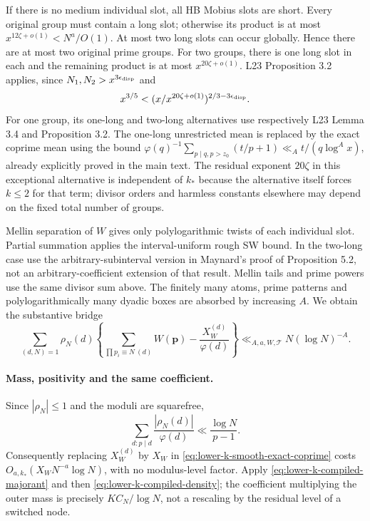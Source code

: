 If there is no medium individual slot, all HB Mobius slots are short.
Every original group must contain a long slot; otherwise its product
is at most $x^{12\zeta+o(1)}<N^a/O(1)$. At most two long slots can
occur globally. Hence there are at most two original prime groups.
For two groups, there is one long slot in each and the remaining
product is at most $x^{20\zeta+o(1)}$. L23 Proposition 3.2 applies,
since $N_1,N_2>x^{3\epsilon_{\rm disp}}$ and
\[
 x^{3/5}<(x/x^{20\zeta+o(1)})^{2/3-3\epsilon_{\rm disp}}.
\]
For one group, its one-long and two-long alternatives use respectively
L23 Lemma 3.4 and Proposition 3.2. The one-long unrestricted mean is
replaced by the exact coprime mean using the bound
$\varphi(q)^{-1}\sum_{p\mid q,p>z_0}(t/p+1)
\ll_A t/(q\log^A x)$, already explicitly proved in the main text.
The residual exponent $20\zeta$ in this exceptional alternative is
independent of $k_*$ because the alternative itself forces $k\le2$
for that term; divisor orders and harmless constants elsewhere may
depend on the fixed total number of groups.

Mellin separation of $W$ gives only polylogarithmic twists of each
individual slot. Partial summation applies the interval-uniform rough
SW bound. In the two-long case use the arbitrary-subinterval version
in Maynard's proof of Proposition 5.2, not an arbitrary-coefficient
extension of that result. Mellin tails and prime powers use the same
divisor sum above. The finitely many atoms, prime patterns and
polylogarithmically many dyadic boxes are absorbed by increasing $A$.
We obtain the substantive bridge
\begin{equation}\label{eq:lower-k-smooth-exact-coprime}
 \sum_{(d,N)=1}\rho_N(d)
 \left\{\sum_{\prod p_i\equiv N\ (d)}W(\boldsymbol p)
           -\frac{X_W^{(d)}}{\varphi(d)}\right\}
 \ll_{A,a,W,\mathcal T}N(\log N)^{-A}.
\end{equation}

\paragraph{Mass, positivity and the same coefficient.}
Since $|\rho_N|\le1$ and the moduli are squarefree,
\[
 \sum_{d:p\mid d}\frac{|\rho_N(d)|}{\varphi(d)}
 \ll\frac{\log N}{p-1}.
\]
Consequently replacing $X_W^{(d)}$ by $X_W$ in
\eqref{eq:lower-k-smooth-exact-coprime} costs
$O_{a,k_*}(X_WN^{-a}\log N)$, with no modulus-level factor.
Apply \eqref{eq:lower-k-compiled-majorant} and then
\eqref{eq:lower-k-compiled-density}; the coefficient multiplying the
outer mass is precisely $K C_N/\log N$, not a rescaling by the
residual level of a switched node.

